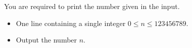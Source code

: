 \problemname{}


\newcommand{\maxn}{123456789}

You are required to print the number given in the input.

\begin{Input}
	\begin{itemize}
		\item One line containing a single integer $0\leq n\leq \maxn$.
	\end{itemize}
\end{Input}

\begin{Output}
	\begin{itemize}
		\item Output the number $n$.
	\end{itemize}
\end{Output}

